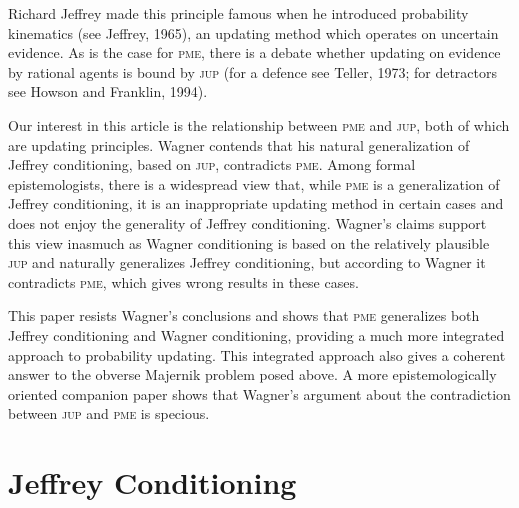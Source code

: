 \documentclass[entropy,article,submit,oneauthor,pdftex,12pt,a4paper]{mdpi}
\begin{document}
Richard Jeffrey made this principle famous when he introduced
probability kinematics (see Jeffrey, 1965), an updating method which
operates on uncertain evidence. As is the case for \textsc{pme}, there
is a debate whether updating on evidence by rational agents is bound
by \textsc{jup} (for a defence see Teller, 1973; for detractors see
Howson and Franklin, 1994). 

Our interest in this article is the relationship between \textsc{pme}
and \textsc{jup}, both of which are updating principles. Wagner
contends that his natural generalization of Jeffrey conditioning,
based on \textsc{jup}, contradicts \textsc{pme}. Among formal
epistemologists, there is a widespread view that, while \textsc{pme}
is a generalization of Jeffrey conditioning, it is an inappropriate
updating method in certain cases and does not enjoy the generality of
Jeffrey conditioning. Wagner's claims support this view inasmuch as
Wagner conditioning is based on the relatively plausible \textsc{jup}
and naturally generalizes Jeffrey conditioning, but according to
Wagner it contradicts \textsc{pme}, which gives wrong results in these
cases.


This paper resists Wagner's conclusions and shows that \textsc{pme}
generalizes both Jeffrey conditioning and Wagner conditioning,
providing a much more integrated approach to probability updating.
This integrated approach also gives a coherent answer to the obverse
Majernik problem posed above. A more epistemologically oriented
companion paper shows that Wagner's argument about the contradiction
between \textsc{jup} and \textsc{pme} is specious.

\section{Jeffrey Conditioning}
\label{jc}
\end{document}
